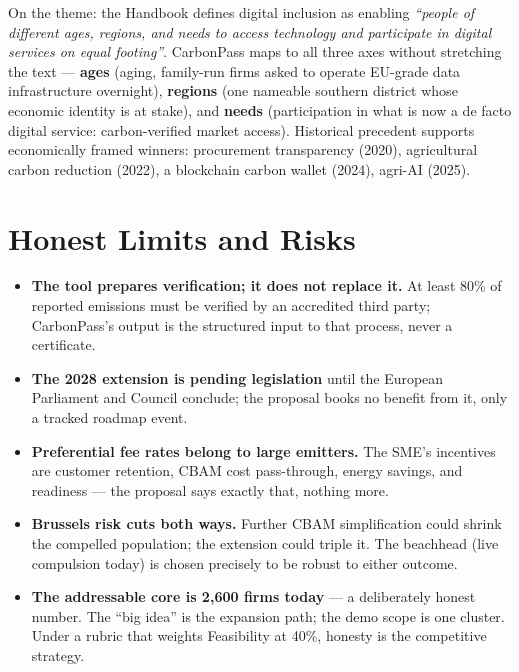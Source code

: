 On the theme: the Handbook defines digital inclusion as enabling \emph{``people
of different ages, regions, and needs to access technology and participate in
digital services on equal footing''}\cite{handbook}. CarbonPass maps to all
three axes without stretching the text --- \textbf{ages} (aging, family-run
firms asked to operate EU-grade data infrastructure overnight),
\textbf{regions} (one nameable southern district whose economic identity is at
stake), and \textbf{needs} (participation in what is now a de facto digital
service: carbon-verified market access). Historical precedent supports
economically framed winners: procurement transparency (2020), agricultural
carbon reduction (2022), a blockchain carbon wallet (2024), agri-AI
(2025)\cite{moda}.

\section{Honest Limits and Risks}\label{sec:risks}

\begin{itemize}[leftmargin=1.3em]
\item \textbf{The tool prepares verification; it does not replace it.} At
least 80\% of reported emissions must be verified by an accredited third
party\cite{omm}; CarbonPass's output is the structured input to that process,
never a certificate.
\item \textbf{The 2028 extension is pending legislation} until the European
Parliament and Council conclude; the proposal books no benefit from it, only a
tracked roadmap event\cite{akin}.
\item \textbf{Preferential fee rates belong to large emitters.} The SME's
incentives are customer retention, CBAM cost pass-through, energy savings, and
readiness --- the proposal says exactly that, nothing more\cite{moenvfee}.
\item \textbf{Brussels risk cuts both ways.} Further CBAM simplification could
shrink the compelled population; the extension could triple it. The beachhead
(live compulsion today) is chosen precisely to be robust to either outcome.
\item \textbf{The addressable core is 2,600 firms today}\cite{tpt-cbam} --- a
deliberately honest number. The ``big idea'' is the expansion path; the demo
scope is one cluster. Under a rubric that weights Feasibility at 40\%, honesty
is the competitive strategy.
\end{itemize}
